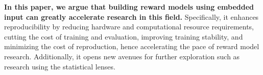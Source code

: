 \textbf{In this paper, we argue that building reward models using embedded input can greatly accelerate research in this field.} Specifically, it enhances reproducibility by reducing hardware and computational resource requirements, cutting the cost of training and evaluation, improving training stability, and minimizing the cost of reproduction, hence accelerating the pace of reward model research. Additionally, it opens new avenues for further exploration such as research using the statistical lenses.

